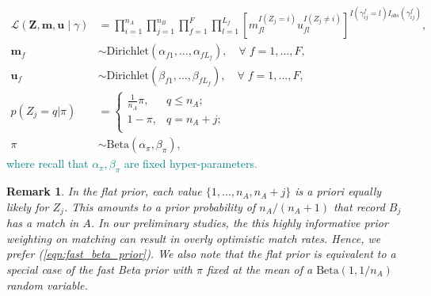 \documentclass[ba]{imsart}
\newtheorem{rem}{Remark}
\begin{document}
\begin{subequations}
\begin{align}
	\mathcal{L}(\bm{Z}, \bm{m}, \bm{u} \mid \gamma) &= \prod_{i=1}^{n_A}  \prod_{j=1}^{n_B}\prod_{f=1}^{F}\prod_{l=1}^{L_f}\left[  m_{fl}^{I(Z_j = i)}u_{fl}^{I(Z_j \neq i)}\right]^{I(\gamma_{ij}^f = l)I_{obs}(\gamma_{ij}^f)}, \label{eqn:likelihood}\\
	\bm{m}_f &\sim \text{Dirichlet}(\alpha_{f1}, \ldots, \alpha_{f L_f}),\quad  \forall  \; f = 1, \ldots, F, \label{eqn:m} \\
	\bm{u}_f &\sim \text{Dirichlet}(\beta_{f1}, \ldots, \beta_{f L_f}), \quad \forall \; f = 1, \ldots, F,  \label{eqn:u}\\
	p(Z_j = q| \pi)  &=
	\begin{cases} 
		\frac{1}{n_A}\pi,  & q \leq n_A; \\
		1-\pi, &  q  = n_A + j; \\
	\end{cases} \label{eqn:z}\\
	\pi &\sim \text{Beta}(\alpha_{\pi}, \beta_{\pi})\label{eqn:pi},
\end{align}
\end{subequations}
\textcolor{teal}{where recall that $\alpha_{\pi}, \beta_{\pi}$ are fixed hyper-parameters.} 

\begin{rem}
In the \cite{wortman2019} flat prior, each value $\{1, \ldots, n_A, n_A +j\}$ is a priori equally likely for $Z_j$. This amounts to a prior probability of $n_A / (n_A + 1)$ that record $B_j$ has a match in $A$. In our preliminary studies, the this highly informative prior weighting on matching can result in overly optimistic match rates. Hence, we prefer (\ref{eqn:fast_beta_prior}). We also note that the flat prior is equivalent to a special case of the fast Beta prior with $\pi$ fixed at the mean of a $\text{Beta}\left(1, 1 / n_A \right)$ random variable.
\end{rem}
\end{document}
